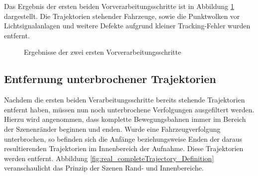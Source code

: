 Das Ergebnis der ersten beiden Vorverarbeitungsschritte ist in Abbildung \ref{fig:real_result_2nd_Prepro} dargestellt.
Die Trajektorien stehender Fahrzeuge, sowie die Punktwolken vor Lichtsignalanlagen und weitere Defekte aufgrund
kleiner Tracking-Fehler wurden entfernt.

\begin{figure}[H]
    \centering
    \qquad \qquad
    \caption{Ergebnisse der zwei ersten Vorverarbeitungsschritte}
    \label{fig:real_result_2nd_Prepro}
\end{figure}


\subsection{Entfernung unterbrochener Trajektorien}

Nachdem die ersten beiden Verarbeitungsschritte bereits stehende Trajektorien entfernt haben,
müssen nun noch unterbrochene Verfolgungen ausgefiltert werden. Hierzu wird angenommen, dass komplette
Bewegungsbahnen immer im Bereich der Szenenränder beginnen und enden. Wurde eine Fahrzeugverfolgung
unterbrochen, so befinden sich die Anfänge beziehungsweise Enden der daraus resultierenden Trajektorien
im Innenbereich der Aufnahme. Diese Trajektorien werden entfernt. Abbildung \ref{fig:real_completeTrajectory_Definition}
veranschaulicht das Prinzip der Szenen Rand- und Innenbereiche.

